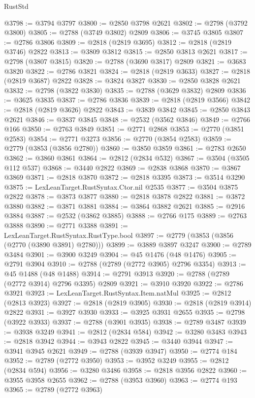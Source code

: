 \begin{lexlean}{RustStd}
\begin{coremodule}
@3798 := @3794 @3797
@3800 := @2850 @3798 @2621
@3802 := @2798 (@3792 @3800)
@3805 := @2788 (@3749 @3802) @2809
@3806 := @3745 @3805
@3807 := @2786 @3806
@3809 := @2818 (@2819 @3695)
@3812 := @2818 (@2819 @3746) @2822
@3813 := @3809 @3812
@3815 := @2850 @3813 @2621
@3817 := @2798 (@3807 @3815)
@3820 := @2788 (@3690 @3817) @2809
@3821 := @3683 @3820
@3822 := @2786 @3821
@3824 := @2818 (@2819 @3633)
@3827 := @2818 (@2819 @3687) @2822
@3828 := @3824 @3827
@3830 := @2850 @3828 @2621
@3832 := @2798 (@3822 @3830)
@3835 := @2788 (@3629 @3832) @2809
@3836 := @3625 @3835
@3837 := @2786 @3836
@3839 := @2818 (@2819 @3566)
@3842 := @2818 (@2819 @3626) @2822
@3843 := @3839 @3842
@3845 := @2850 @3843 @2621
@3846 := @3837 @3845
@3848 := @2532 (@3562 @3846)
@3849 := @2766 @166
@3850 := @2763 @3849
@3851 := @2771 @2868
@3853 := @2770 (@3851 @2583)
@3854 := @2771 @3273
@3856 := @2770 (@3854 @2583)
@3859 := @2779 (@3853 (@3856 @2780))
@3860 := @3850 @3859
@3861 := @2783 @2650
@3862 := @3860 @3861
@3864 := @2812 (@2834 @532)
@3867 := @3504 (@3505 @112 @537)
@3868 := @3440 @2822
@3869 := @2838 @3868
@3870 := @3867 @3869
@3871 := @2818 @3870
@3872 := @2818 @3395
@3873 := @3514 @3290
@3875 := LexLeanTarget.RustSyntax.Ctor.nil @2535
@3877 := @3504 @3875 @2822
@3878 := @3873 @3877
@3880 := @2818 @3878 @2822
@3881 := @3872 @3880
@3882 := @3871 @3881
@3884 := @3864 @3882 @2621
@3885 := @2916 @3884
@3887 := @2532 (@3862 @3885)
@3888 := @2766 @175
@3889 := @2763 @3888
@3890 := @2771 @3388
@3891 := LexLeanTarget.RustSyntax.RustType.bool
@3897 := @2779 (@3853 (@3856 (@2770 (@3890 @3891) @2780)))
@3899 := @3889 @3897 @3247
@3900 := @2789 @3484
@3901 := @3900 @3249
@3904 := @45 @1476 (@48 @1476)
@3905 := @2791 @3904
@3910 := @2788 (@2789 (@2772 @3905) @2796 @3354)
@3913 := @45 @1488 (@48 @1488)
@3914 := @2791 @3913
@3920 := @2788 (@2789 (@2772 @3914) @2796 @3395) @2809
@3921 := @3910 @3920
@3922 := @2786 @3921
@3923 := LexLeanTarget.RustSyntax.Item.natMul
@3925 := @2812 (@2813 @3923)
@3927 := @2818 (@2819 @3905)
@3930 := @2818 (@2819 @3914) @2822
@3931 := @3927 @3930
@3933 := @3925 @3931 @2655
@3935 := @2798 (@3922 @3933)
@3937 := @2788 (@3901 @3935)
@3938 := @2789 @3487
@3939 := @3938 @3249
@3941 := @2812 (@2834 @584)
@3942 := @3280 @3483
@3943 := @2818 @3942
@3944 := @3943 @2822
@3945 := @3440 @3944
@3947 := @3941 @3945 @2621
@3949 := @2788 (@3939 @3947)
@3950 := @2774 @184
@3952 := @2789 (@2772 @3950)
@3953 := @3952 @3249
@3955 := @2812 (@2834 @594)
@3956 := @3280 @3486
@3958 := @2818 @3956 @2822
@3960 := @3955 @3958 @2655
@3962 := @2788 (@3953 @3960)
@3963 := @2774 @193
@3965 := @2789 (@2772 @3963)

\end{coremodule}
\end{lexlean}
